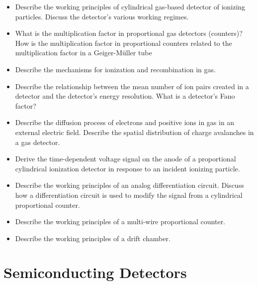 \begin{itemize}

    \item Describe the working principles of cylindrical gas-based detector of ionizing particles.
    Discuss the detector's various working regimes.

    \item What is the multiplication factor in proportional gas detectors (counters)?
    How is the multiplication factor in proportional counters related to the multiplication factor in a Geiger-Müller tube

    \item Describe the mechanisms for ionization and recombination in gas.

    \item Describe the relationship between the mean number of ion pairs created in a detector and the detector's energy resolution. 
    What is a detector's Fano factor?

    \item Describe the diffusion process of electrons and positive ions in gas in an external electric field.
    Describe the spatial distribution of charge avalanches in a gas detector.

    \item Derive the time-dependent voltage signal on the anode of a proportional cylindrical ionization detector in response to an incident ionizing particle.

    \item Describe the working principles of an analog differentiation circuit.
    Discuss how a differentiation circuit is used to modify the signal from a cylindrical proportional counter.

    \item Describe the working principles of a multi-wire proportional counter.

    \item Describe the working principles of a drift chamber.

\end{itemize}

\section{Semiconducting Detectors}

